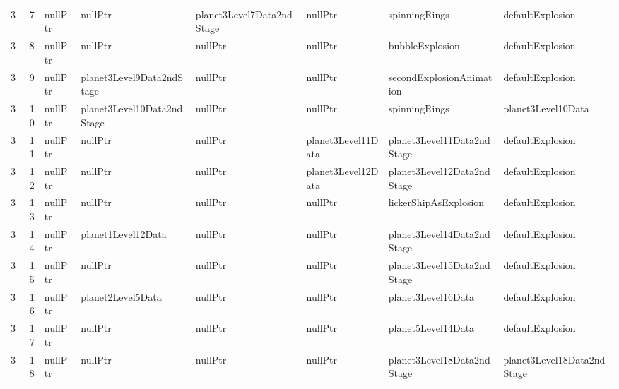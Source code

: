 \begin{tabular}{rrllllll}
      3 &       7 & nullPtr                  & nullPtr                      & planet3Level7Data2ndStage    & nullPtr                   & spinningRings              & defaultExplosion           \\
      3 &       8 & nullPtr                  & nullPtr                      & nullPtr                      & nullPtr                   & bubbleExplosion            & defaultExplosion           \\
      3 &       9 & nullPtr                  & planet3Level9Data2ndStage    & nullPtr                      & nullPtr                   & secondExplosionAnimation   & defaultExplosion           \\
      3 &      10 & nullPtr                  & planet3Level10Data2ndStage   & nullPtr                      & nullPtr                   & spinningRings              & planet3Level10Data         \\
      3 &      11 & nullPtr                  & nullPtr                      & nullPtr                      & planet3Level11Data        & planet3Level11Data2ndStage & defaultExplosion           \\
      3 &      12 & nullPtr                  & nullPtr                      & nullPtr                      & planet3Level12Data        & planet3Level12Data2ndStage & defaultExplosion           \\
      3 &      13 & nullPtr                  & nullPtr                      & nullPtr                      & nullPtr                   & lickerShipAsExplosion      & defaultExplosion           \\
      3 &      14 & nullPtr                  & planet1Level12Data           & nullPtr                      & nullPtr                   & planet3Level14Data2ndStage & defaultExplosion           \\
      3 &      15 & nullPtr                  & nullPtr                      & nullPtr                      & nullPtr                   & planet3Level15Data2ndStage & defaultExplosion           \\
      3 &      16 & nullPtr                  & planet2Level5Data            & nullPtr                      & nullPtr                   & planet3Level16Data         & defaultExplosion           \\
      3 &      17 & nullPtr                  & nullPtr                      & nullPtr                      & nullPtr                   & planet5Level14Data         & defaultExplosion           \\
      3 &      18 & nullPtr                  & nullPtr                      & nullPtr                      & nullPtr                   & planet3Level18Data2ndStage & planet3Level18Data2ndStage \\

\end{tabular}
